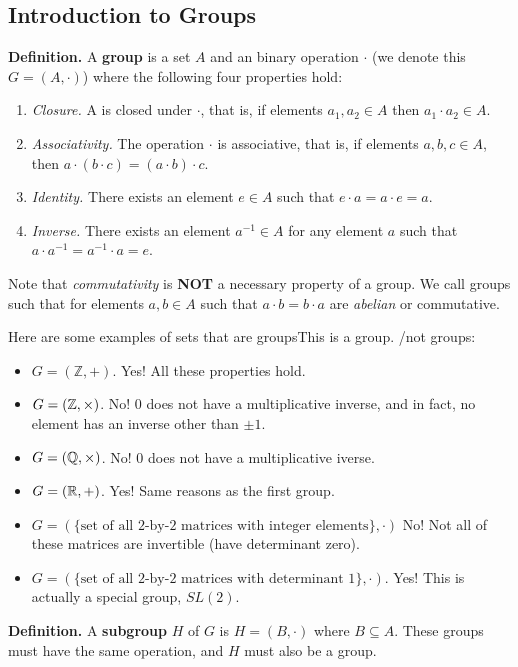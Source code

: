 \subsection{Introduction to Groups}
\textbf{Definition. } A \textbf{group} is a set $A$ and an binary operation $\cdot$ (we denote this $G = (A, \cdot)$) where the following four properties hold: 
\begin{enumerate}
\item \textit{Closure.} A is closed under $\cdot$, that is, if elements $a_1, a_2 \in A$ then $a_1 \cdot a_2 \in A$. 
\item \textit{Associativity. } The operation $\cdot$ is associative, that is, if elements $a, b, c \in A$, then $a \cdot (b \cdot c) = (a \cdot b) \cdot c$. 
\item \textit{Identity. } There exists an element $e \in A$ such that $e \cdot a = a \cdot e = a$. 
\item \textit{Inverse. } There exists an element $a^{-1} \in A$ for any element $a$ such that $a \cdot a^{-1} = a^{-1} \cdot a = e$. 
\end{enumerate}  
Note that \textit{commutativity} is \textbf{NOT} a necessary property of a group. We call groups such that for elements $a, b \in A$ such that $a \cdot b = b \cdot a$ are \textit{abelian} or commutative.

Here are some examples of sets that are groupsThis is a group. /not groups: 
\begin{itemize}
\item $G = (\mathbb{Z}, +)$. Yes! All these properties hold. 
\item $G = (\mathbb{Z}, \times)$. No! $0$ does not have a multiplicative inverse, and in fact, no element has an inverse other than $\pm 1$. 
\item $G = (\mathbb{Q}, \times)$. No! $0$ does not have a multiplicative iverse. 
\item $G = (\mathbb{R}, +)$. Yes! Same reasons as the first group. 
\item $G = (\{\text{set of all 2-by-2 matrices with integer elements} \}, \cdot)$ No! Not all of these matrices are invertible (have determinant zero). 
\item $G = (\{\text{set of all 2-by-2 matrices with determinant 1} \}, \cdot)$. Yes! This is actually a special group, $SL(2)$. 
\end{itemize}

\textbf{Definition. } A \textbf{subgroup} $H$ of $G$ is $H = (B, \cdot)$ where $B \subseteq A$. These groups must have the same operation, and $H$ must also be a group. 


